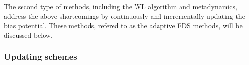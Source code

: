 \documentclass[reprint, superscriptaddress, floatfix]{revtex4-1}
\begin{document}
The second type of methods,
including the WL algorithm and metadynamics,
address the above shortcomings
by continuously and incrementally updating the bias potential.
%
These methods, refered to as the adaptive FDS methods,
will be discussed below.


\subsubsection{Updating schemes}
\end{document}
